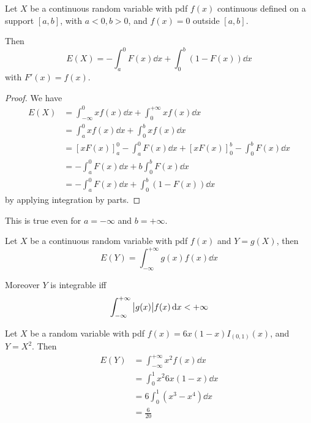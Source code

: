\documentclass[14pt]{extarticle}
\begin{document}
\begin{theorem}
    Let $X$ be a continuous random variable with pdf $f(x)$ continuous defined on a support $[a, b]$, with $a < 0, b > 0$, and $f(x) = 0$ outside $[a, b]$.

    Then
    \begin{equation}
        E(X) = -\int_{a}^0 F(x) \dd{x} + \int_0^b (1 - F(x)) \dd{x}
    \end{equation}
    with $F'(x) = f(x)$.
\end{theorem}

\begin{proof}
    We have
    \begin{align}
        E(X) & = \int_{-\infty}^0 x f(x) \dd{x} + \int_0^{+\infty} x f(x) \dd{x}           \\
             & = \int_{a}^0 x f(x) \dd{x} + \int_0^{b} x f(x) \dd{x}                       \\
             & = [x F(x)]_a^0 - \int_a^0 F(x) \dd{x} + [x F(x)]_0^b - \int_0^b F(x) \dd{x} \\
             & = -\int_a^0 F(x) \dd{x} + b \int_0^b F(x) \dd{x}                            \\
             & = -\int_a^0 F(x) \dd{x} + \int_0^b (1-F(x)) \dd{x}
    \end{align}
    by applying integration by parts.
\end{proof}

\begin{remark}
    This is true even for $a = -\infty$ and $b = +\infty$.
\end{remark}

\begin{proposition}
    Let $X$ be a continuous random variable with pdf $f(x)$ and $Y = g(X)$, then
    \begin{equation}
        E(Y) = \int_{-\infty}^{+\infty} g(x) f(x) \dd{x}
    \end{equation}

    Moreover $Y$ is integrable iff
    \begin{equation}
        \int_{-\infty}^{+\infty} \abs{g(x)} f(x) \dd{x} < +\infty
    \end{equation}
\end{proposition}

\begin{example}
    Let $X$ be a random variable with pdf $f(x) = 6x(1-x) I_{(0, 1)}(x)$, and $Y = X^2$.
    Then
    \begin{align}
        E(Y) & = \int_{-\infty}^{+\infty} x^2 f(x) \dd{x} \\
             & = \int_0^1 x^2 6x(1-x) \dd{x}              \\
             & = 6 \int_0^1 (x^3 - x^4) \dd{x}            \\
             & = \frac{6}{20}
    \end{align}
\end{example}
\end{document}
